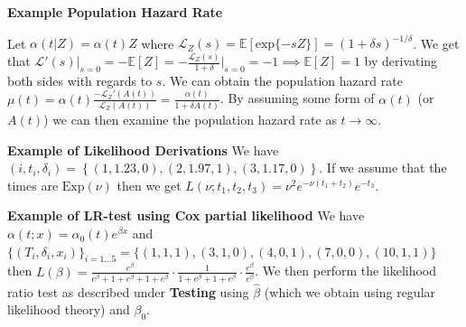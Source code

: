 \documentclass{article}
\begin{document}
\medskip

\textbf{Example Population Hazard Rate}

Let $\alpha(t|Z) = \alpha(t)Z$ where $\mathcal{L}_Z(s) = \mathbb{E}[\text{exp}\{-sZ\}] = (1+\delta s)^{-1/\delta}$. We get that $\mathcal{L}'(s)\big|_{s=0}  = -\mathbb{E}[Z] = -\frac{\mathcal{L}_Z(s)}{1+\delta }\big|_{s=0} = -1 \implies \mathbb{E}[Z] = 1$ by derivating both sides with regards to $s$. We can obtain the population hazard rate $\mu(t) = \alpha(t)\frac{-\mathcal{L}_Z'(A(t))}{\mathcal{L}_Z(A(t))} = \frac{\alpha(t)}{1 + \delta A(t)}$. By assuming some form of $\alpha(t)$ (or $A(t)$) we can then examine the population hazard rate as $t \to \infty$. 

\medskip

\textbf{Example of Likelihood Derivations} We have $(i, t_i, \delta_i) = \left\{(1,1.23,0),(2,1.97,1),(3, 1.17, 0)\right\}$. If we assume that the times are $\text{Exp}(\nu)$ then we get $L(\nu; t_1, t_2, t_3) = \nu^2 e^{-\nu(t_1 + t_2)} e^{-t_3}$. 

\medskip

\textbf{Example of LR-test using Cox partial likelihood}
We have $\alpha(t; x) = \alpha_0(t)e^{\beta x}$ and 
$\{(T_i, \delta_i, x_i)\}_{i=1...5} = \{(1, 1, 1),(3, 1, 0),(4, 0, 1),(7, 0, 0),(10, 1, 1) \}$ then $L(\beta) = \frac{e^{\beta}}{e^{\beta}+1+e^{\beta}+1+e^{\beta}} \cdot \frac{1}{1+e^{\beta}+1+e^{\beta}} \cdot \frac{e^{\beta}}{e^{\beta}}$. We then perform the likelihood ratio test as described under \textbf{Testing} using $\hat\beta$ (which we obtain using regular likelihood theory) and $\beta_0$. 
\end{document}
